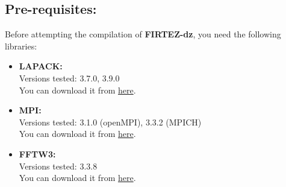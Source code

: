 %
\subsection{Pre-requisites:}
\label{ssec:prereq}
%
Before attempting the compilation of {\bf FIRTEZ-dz}, you need the following libraries:
%
\begin{itemize}
  \item {\bf LAPACK:} \\
  Versions tested: 3.7.0, 3.9.0\\
  You can download it from \href{http://www.netlib.org/lapack/}{here}.\\
  \item {\bf MPI:}\\
  Versions tested: 3.1.0 (openMPI), 3.3.2 (MPICH)\\
  You can download it from \href{https://www.open-mpi.org/}{here}.\\
  \item {\bf FFTW3:}\\
  Versions tested: 3.3.8\\
  You can download it from \href{http://www.fftw.org/}{here}.\\
\end{itemize}
%
